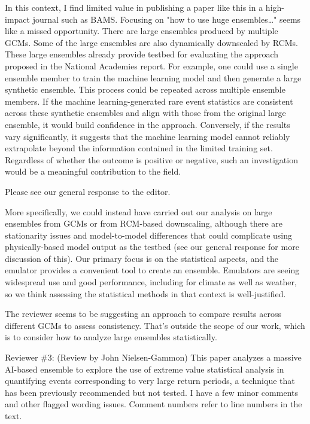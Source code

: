 \documentclass[12pt,english]{reviewresponse}
\begin{document}
\begin{revcomment}
    
In this context, I find limited value in publishing a paper like this in a high-impact journal such as BAMS. Focusing on "how to use huge ensembles…" seems like a missed opportunity. There are large ensembles produced by multiple GCMs. Some of the large ensembles are also dynamically downscaled by RCMs. These large ensembles already provide testbed for evaluating the approach proposed in the National Academies report. For example, one could use a single ensemble member to train the machine learning model and then generate a large synthetic ensemble. This process could be repeated across multiple ensemble members. If the machine learning-generated rare event statistics are consistent across these synthetic ensembles and align with those from the original large ensemble, it would build confidence in the approach. Conversely, if the results vary significantly, it suggests that the machine learning model cannot reliably extrapolate beyond the information contained in the
limited training set. Regardless of whether the outcome is positive or negative, such an investigation would be a meaningful contribution to the field.
\end{revcomment}
\begin{revresponse}
Please see our general response to the editor.

More specifically, we could instead have carried out our analysis on large ensembles from GCMs or from RCM-based downscaling, although there are stationarity issues and model-to-model differences that could complicate using physically-based model output as the testbed (see our general response for more discussion of this). Our primary focus is on the statistical aspects, and the emulator provides a convenient tool to create an ensemble. Emulators are seeing widespread use and good performance, including for climate as well as weather, so we think assessing the statistical methods in that context is well-justified.

The reviewer seems to be suggesting an approach to compare results across different GCMs to assess consistency. That's outside the scope of our work, which is to consider how to analyze large ensembles statistically. 
\end{revresponse}



\reviewer

Reviewer \#3: (Review by John Nielsen-Gammon) This paper analyzes a massive AI-based ensemble to explore the use of extreme value statistical analysis in quantifying events corresponding to very large return periods, a technique that has been previously recommended but not tested.   I have a few minor comments and other flagged wording issues.  Comment numbers refer to line numbers in the text. 
\end{document}
